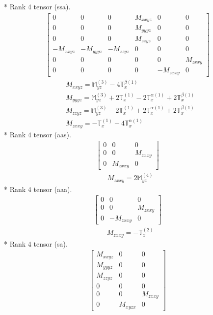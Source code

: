 \documentclass[fleqn,8pt,landscape]{jsarticle}
\begin{document}
* Rank 4 tensor (ssa).
\begin{align*}
\begin{bmatrix} 0 & 0 & 0 & M_{xxyz} & 0 & 0 \\ 0 & 0 & 0 & M_{yyyz} & 0 & 0 \\ 0 & 0 & 0 & M_{zzyz} & 0 & 0 \\ - M_{xxyz} & - M_{yyyz} & - M_{zzyz} & 0 & 0 & 0 \\ 0 & 0 & 0 & 0 & 0 & M_{zxxy} \\ 0 & 0 & 0 & 0 & - M_{zxxy} & 0 \end{bmatrix}
\end{align*}
\begin{align*}
& M_{xxyz} = \mathbb{M}_{yz}^{(3)} - 4 \mathbb{T}_{x}^{\beta(1)} \\
& M_{yyyz} = \mathbb{M}_{yz}^{(3)} + 2 \mathbb{T}_{x}^{(1)} - 2 \mathbb{T}_{x}^{\alpha(1)} + 2 \mathbb{T}_{x}^{\beta(1)} \\
& M_{zzyz} = \mathbb{M}_{yz}^{(3)} - 2 \mathbb{T}_{x}^{(1)} + 2 \mathbb{T}_{x}^{\alpha(1)} + 2 \mathbb{T}_{x}^{\beta(1)} \\
& M_{zxxy} = - \mathbb{T}_{x}^{(1)} - 4 \mathbb{T}_{x}^{\alpha(1)}
\end{align*}
* Rank 4 tensor (aas).
\begin{align*}
\begin{bmatrix} 0 & 0 & 0 \\ 0 & 0 & M_{zxxy} \\ 0 & M_{zxxy} & 0 \end{bmatrix}
\end{align*}
\begin{align*}
& M_{zxxy} = 2 \mathbb{M}_{yz}^{(4)}
\end{align*}
* Rank 4 tensor (aaa).
\begin{align*}
\begin{bmatrix} 0 & 0 & 0 \\ 0 & 0 & M_{zxxy} \\ 0 & - M_{zxxy} & 0 \end{bmatrix}
\end{align*}
\begin{align*}
& M_{zxxy} = - \mathbb{T}_{x}^{(2)}
\end{align*}
* Rank 4 tensor (sa).
\begin{align*}
\begin{bmatrix} M_{xxyz} & 0 & 0 \\ M_{yyyz} & 0 & 0 \\ M_{zzyz} & 0 & 0 \\ 0 & 0 & 0 \\ 0 & 0 & M_{zxxy} \\ 0 & M_{xyzx} & 0 \end{bmatrix}
\end{align*}
\end{document}
